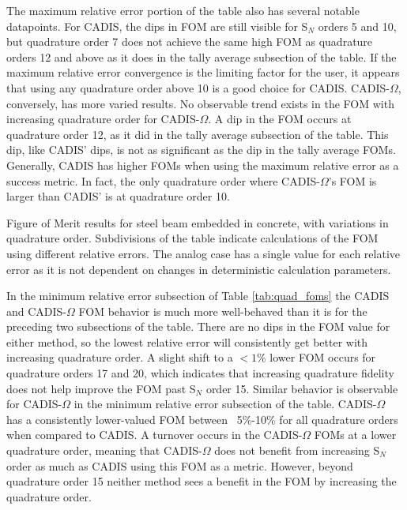 The maximum relative error portion of the table also has several notable
datapoints. For CADIS, the dips in FOM are still visible for S$_N$ orders 5 and
10, but quadrature order 7 does not achieve the same high FOM as quadrature
orders 12 and above as it does in the tally average subsection of the table. If
the maximum relative error convergence is the limiting factor for the user,
it appears that using any quadrature order above 10 is a good choice for CADIS.
CADIS-$\Omega$, conversely, has more varied results. No observable trend exists
in the FOM with increasing quadrature order for CADIS-$\Omega$. A dip
in the FOM occurs at quadrature order 12, as it did in the tally average
subsection of the table. This dip, like CADIS' dips, is not as significant as
the dip in the tally average FOMs. Generally, CADIS has higher FOMs when using
the maximum relative error as a success metric. In fact, the only quadrature order where
CADIS-$\Omega$'s FOM is larger than CADIS' is at quadrature order 10.


\begin{table}[h!]
  \centering
  
  \caption[Figure of Merit results for steel beam embedded in concrete, with
  variations in quadrature order.]{Figure of Merit results for steel beam embedded in concrete, with
  variations in quadrature order. Subdivisions of the table indicate
calculations of the FOM using different relative errors. The analog case has a
single value for each relative error as it is not dependent on changes in
deterministic calculation parameters.}
  \label{tab:quad_foms}
\end{table}

In the minimum relative error subsection of Table \ref{tab:quad_foms}
the CADIS and CADIS-$\Omega$ FOM behavior is
much more well-behaved than it is for the preceding two subsections of the
table. There are no dips in the FOM value for either method,
so the lowest relative error will
consistently get better with increasing quadrature order. A slight shift
to a $<1\%$ lower FOM
occurs for quadrature orders 17 and 20, which indicates that increasing
quadrature fidelity does not help improve the FOM past S$_N$ order 15. Similar
behavior is observable for CADIS-$\Omega$ in the minimum relative error
subsection of the table. CADIS-$\Omega$ has a consistently lower-valued FOM
between ~5\%-10\% for all quadrature orders when compared to CADIS.
A turnover occurs in the CADIS-$\Omega$
FOMs at a lower quadrature order, meaning that CADIS-$\Omega$ does not benefit
from increasing S$_N$ order as much as CADIS using this FOM as a metric.
However, beyond quadrature order 15 neither method sees a benefit in the FOM by
increasing the quadrature order.

